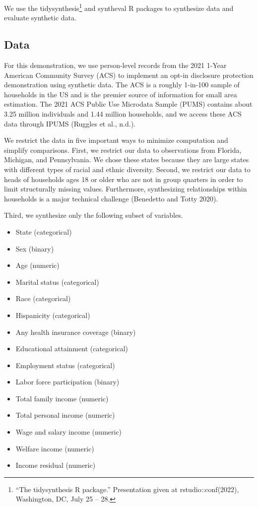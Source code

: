 \documentclass[
]{urban-formatting}
\providecommand{\tightlist}{%
  \setlength{\itemsep}{0pt}\setlength{\parskip}{0pt}}\usepackage{longtable,booktabs,array}
\begin{document}
We use the tidysynthesis\footnote{``The tidysynthesis R package.''
  Presentation given at rstudio::conf(2022), Washington, DC, July 25 --
  28.} and syntheval R packages to synthesize data and evaluate
synthetic data.

\subsection{Data}

For this demonstration, we use person-level records from the 2021 1-Year
American Community Survey (ACS) to implement an opt-in disclosure
protection demonstration using synthetic data. The ACS is a roughly
1-in-100 sample of households in the US and is the premier source of
information for small area estimation. The 2021 ACS Public Use Microdata
Sample (PUMS) contains about 3.25 million individuals and 1.44 million
households, and we access these ACS data through IPUMS (Ruggles et al.,
n.d.).

We restrict the data in five important ways to minimize computation and
simplify comparisons. First, we restrict our data to observations from
Florida, Michigan, and Pennsylvania. We chose these states because they
are large states with different types of racial and ethnic diversity.
Second, we restrict our data to heads of households ages 18 or older who
are not in group quarters in order to limit structurally missing values.
Furthermore, synthesizing relationships within households is a major
technical challenge (Benedetto and Totty 2020).

Third, we synthesize only the following subset of variables.

\begin{itemize}
\tightlist
\item
  State (categorical)
\item
  Sex (binary)
\item
  Age (numeric)
\item
  Marital status (categorical)
\item
  Race (categorical)
\item
  Hispanicity (categorical)
\item
  Any health insurance coverage (binary)
\item
  Educational attainment (categorical)
\item
  Employment status (categorical)
\item
  Labor force participation (binary)
\item
  Total family income (numeric)
\item
  Total personal income (numeric)
\item
  Wage and salary income (numeric)
\item
  Welfare income (numeric)
\item
  Income residual (numeric)
\end{itemize}
\end{document}
